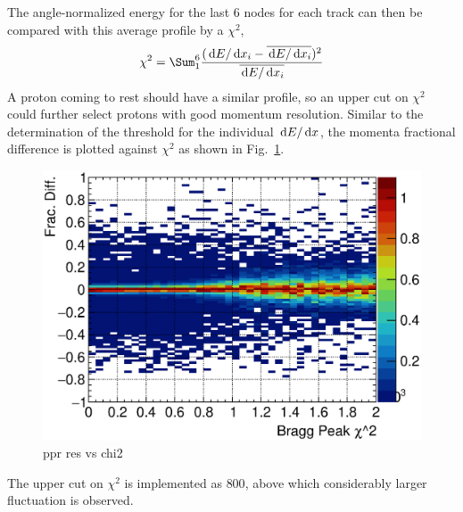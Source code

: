     The angle-normalized energy for the last 6 nodes for each track can then be compared with this average profile by a $\chi^2$,
    \begin{equation}
     \chi^2 = \Sum^6_1 \frac{(\dedx_i - \overline{\dedx_i})^2}{\overline{\dedx_i}}
    \end{equation}
    A proton coming to rest should have a similar profile, so an upper cut on $\chi^2$ could further select protons with good momentum resolution. 
    Similar to the determination of the threshold for the individual $\,\textrm{d}E/\,\textrm{d}x$, the momenta fractional difference is plotted against $\chi^2$ as shown in Fig.~\ref{fig:esc-mom-res-chi2}.
    \begin{figure}[h]
       \centering
       \includegraphics[width=\sgfidwid\textwidth]{figures/sel/brchi2_colnor_vs_p_pr_res_hist2d_al2_selpr_con_test.eps} 
       \caption{ppr res vs chi2}
       \label{fig:esc-mom-res-chi2}
    \end{figure}
    The upper cut on $\chi^2$ is implemented as $800$, above which considerably larger fluctuation is observed.

